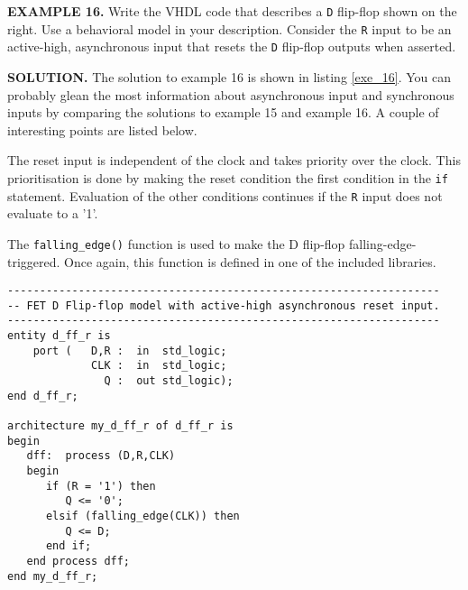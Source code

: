 \begin{leftbar}
\begin{minipage}{0.5\linewidth}
\noindent
\textbf{EXAMPLE 16.}
Write the VHDL code that describes a \texttt{D} flip-flop shown on the right. Use a behavioral model in your description. Consider the \texttt{R} input to be an active-high, asynchronous input that resets the \texttt{D} flip-flop outputs when asserted.
\end{minipage}
\begin{minipage}{0.47\linewidth}
\begin{flushright}
\end{flushright}
\end{minipage}
\end{leftbar}
\noindent
\textbf{SOLUTION.} The solution to example 16 is shown in listing \ref{exe_16}. You can probably glean the most information about asynchronous input and synchronous inputs by comparing the solutions to example 15 and example 16. A couple of interesting points are listed below. 
\begin{my_list}
\item The reset input is independent of the clock and takes priority over the clock. This prioritisation is done by making the reset condition the first condition in the \texttt{if} statement. Evaluation of the other conditions continues if the \texttt{R} input does not evaluate to a '1'.
\item The \texttt{falling\_edge()} function is used to make the D flip-flop falling-edge-triggered. Once again, this function is defined in one of the included libraries. 
\end{my_list}
\begin{lstlisting}[label=exe_16, caption=Solution to example 16.]
-------------------------------------------------------------------
-- FET D Flip-flop model with active-high asynchronous reset input.
-------------------------------------------------------------------
entity d_ff_r is 
    port (   D,R :  in  std_logic; 
             CLK :  in  std_logic; 
               Q :  out std_logic); 
end d_ff_r;

architecture my_d_ff_r of d_ff_r is 
begin
   dff:  process (D,R,CLK)
   begin
      if (R = '1') then 
         Q <= '0'; 
      elsif (falling_edge(CLK)) then 
         Q <= D; 
      end if; 
   end process dff; 
end my_d_ff_r; 
\end{lstlisting}    

